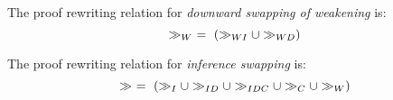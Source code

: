 \documentclass{llncs}
\begin{document}
\begin{definition}[$\swapWD$]
\end{definition}




\begin{definition}[$\swapW$]
\label{definition:SwappingWeakening}
The proof rewriting relation for \emph{downward swapping of weakening} is:
$$
\gg_{W} \ = \ (\gg_{WI} \cup \gg_{WD})
$$
\end{definition}


\begin{definition}[$\swap$] 
\label{definition:Swapping}
The proof rewriting relation for \emph{inference swapping} is:
$$
\gg \ = \ (\gg_I \cup \gg_{ID} \cup \gg_{IDC} \cup \gg_C \cup \gg_{W})
$$
\end{definition}
\end{document}
